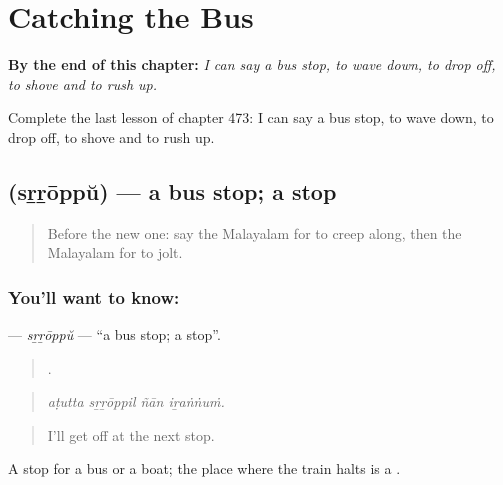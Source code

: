 
\chapter{Catching the Bus}
\label{ch:ml-catching-the-bus}

\begin{chapteropening}
\textbf{By the end of this chapter:} \emph{I can say a bus stop, to wave down, to drop off, to shove and to rush up.}

Complete the last lesson of chapter 473: I can say a bus stop, to wave down, to drop off, to shove and to rush up.
\end{chapteropening}

\section[\texorpdfstring{\ml{സ്റ്റോപ്പ്} (sṟṟōppŭ)}{സ്റ്റോപ്പ് (sṟṟōppŭ)}]{ (sṟṟōppŭ) — a bus stop; a stop}

\label{lesson:ML-C473-srroppu}



\begin{quote}
Before the new one: say the Malayalam for to creep along, then the Malayalam for to jolt.
\end{quote}

\subsection*{You'll want to know: }
\textbf{} — \emph{sṟṟōppŭ} — \textquotedblleft{}a bus stop; a stop\textquotedblright{}.

\begin{quote}
   .
\end{quote}

\begin{quote}
\emph{aṭutta sṟṟōppil ñān iṟaṅṅuṁ.}
\end{quote}

\begin{quote}
I'll get off at the next stop.
\end{quote}

A stop for a bus or a boat; the place where the train halts is a .


